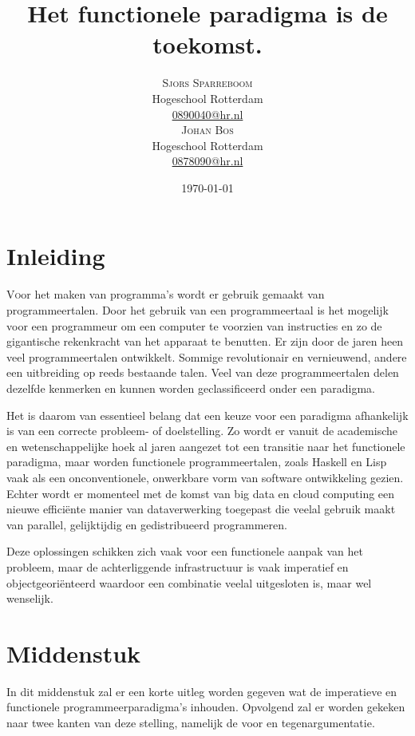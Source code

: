 \documentclass[twoside,twocolumn]{article}
\title{Het functionele paradigma is de toekomst.} %
\author{%
\textsc{Sjors Sparreboom} \\[1ex] %
\normalsize Hogeschool Rotterdam \\ %
\normalsize \href{mailto:0890040@hr.nl}{0890040@hr.nl} \\[2ex] %
\textsc{Johan Bos} \\[1ex] %
\normalsize Hogeschool Rotterdam \\ %
\normalsize \href{mailto:0878090@hr.nl}{0878090@hr.nl} %
}
\date{\today} %
\begin{document}
\nocite{*}

\maketitle


\section{Inleiding}
\lettrine[nindent=0em,lines=3]{V}oor het maken van programma's wordt er gebruik
gemaakt van programmeertalen.  Door het gebruik van een programmeertaal is het
mogelijk voor een programmeur om een computer te voorzien van instructies en zo
de gigantische rekenkracht van het apparaat te benutten. Er zijn door de jaren
heen veel programmeertalen ontwikkelt. Sommige revolutionair en vernieuwend,
andere een uitbreiding op reeds bestaande talen. Veel van deze programmeertalen
delen dezelfde kenmerken en kunnen worden geclassificeerd onder een
paradigma.

Het is daarom van essentieel belang dat een keuze voor een paradigma
afhankelijk is van een correcte probleem- of doelstelling. Zo wordt er vanuit
de academische en wetenschappelijke hoek al jaren aangezet tot een transitie
naar het functionele paradigma, maar worden functionele programmeertalen, zoals
Haskell en Lisp vaak als een onconventionele, onwerkbare vorm van software
ontwikkeling gezien. Echter wordt er momenteel met de komst van big data en
cloud computing een nieuwe effici\"ente manier van dataverwerking toegepast die
veelal gebruik maakt van parallel, gelijktijdig en gedistribueerd programmeren.

Deze oplossingen schikken zich vaak voor een functionele aanpak van het
probleem, maar de achterliggende infrastructuur is vaak imperatief en
objectgeori\"enteerd waardoor een combinatie veelal uitgesloten is, maar wel
wenselijk.


\section{Middenstuk}

In dit middenstuk zal er een korte uitleg worden gegeven wat de imperatieve en
functionele programmeerparadigma's inhouden. Opvolgend zal er worden gekeken
naar twee kanten van deze stelling, namelijk de voor en tegenargumentatie.
\end{document}
